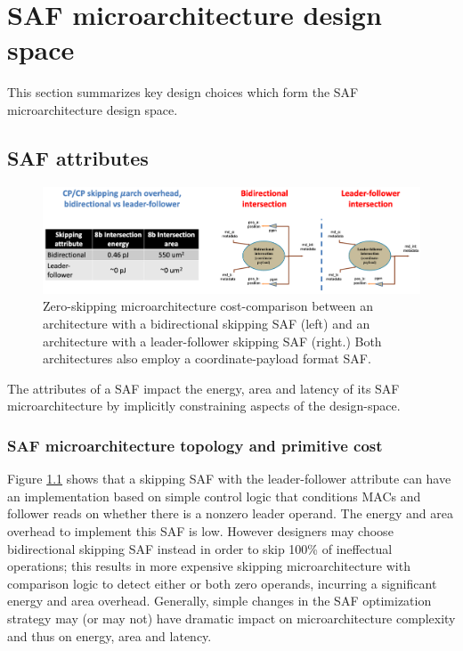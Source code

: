 \chapter{SAF microarchitecture design space}

This section summarizes key design choices which form the SAF microarchitecture design space.

\section{SAF attributes}
%
%
\begin{figure}[ht]
\includegraphics[width=\textwidth]{figures/saf_attributes_impact_uarch_cost.PNG}
\caption{Zero-skipping microarchitecture cost-comparison between an architecture with a bidirectional skipping SAF (left) and an architecture with a leader-follower skipping SAF (right.) Both architectures also employ a coordinate-payload format SAF.}
\label{fig:saf_attributes_impact_uarch_cost}
\centering
\end{figure}
%
%
The attributes of a SAF impact the energy, area and latency of its SAF microarchitecture by implicitly constraining aspects of the design-space.
%
\subsection{SAF microarchitecture topology and primitive cost} 

Figure \ref{fig:saf_attributes_impact_uarch_cost} shows that a skipping SAF with the leader-follower attribute can have an implementation based on simple control logic that conditions MACs and follower reads on whether there is a nonzero leader operand. The energy and area overhead to implement this SAF is low. However designers may choose bidirectional skipping SAF instead in order to skip 100\% of ineffectual operations; this results in more expensive skipping microarchitecture with comparison logic to detect either or both zero operands, incurring a significant energy and area overhead. Generally, simple changes in the SAF optimization strategy may (or may not) have dramatic impact on microarchitecture complexity and thus on energy, area and latency.
%
